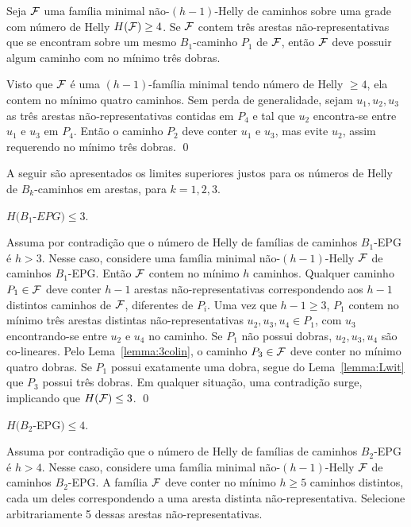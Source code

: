 \begin{lemma} \label{lemma:Lwit}
Seja $\cal{F}$ uma família minimal não-$(h-1)$-Helly de caminhos sobre uma grade com  número de Helly $H({\cal F}) \geq 4$. Se  ${\cal F}$ contem três arestas  não-representativas que se encontram sobre um mesmo $B_1$-caminho  $P_1$ de $\cal{F}$, então $\cal {F}$ deve possuir algum caminho com no mínimo três dobras. \end{lemma}

\proof
Visto que $\cal{F}$ é uma  $(h-1)$-família minimal tendo  número de Helly $\geq 4$, ela contem no mínimo quatro caminhos. Sem perda de generalidade, sejam  $u_1, u_2, u_3$ as três arestas não-representativas contidas em $P_4$ e tal que  $u_2$ encontra-se entre $u_1$ e $u_3$ em $P_4$. Então o caminho $P_2$ deve conter $u_1$ e $u_3$, mas evite $u_2$, assim requerendo no mínimo três dobras.  
\qed

A seguir são apresentados os limites superiores justos para os números de Helly de $B_k$-caminhos em arestas, para $k = 1,2,3$.

\begin{lema}\label{claim:upper-B1}
$H(B_1$-$EPG) \leq 3.$
\end{lema}
 
\proof
Assuma por contradição que o número de Helly de famílias de caminhos $B_1$-EPG é $h > 3$. Nesse caso, considere uma família minimal não-$(h-1)$-Helly $\cal F$ de caminhos $B_1$-EPG. Então $\cal F$ contem no mínimo  $h$ caminhos.  
Qualquer caminho $P_1 \in \cal{F}$ deve conter $h-1$ arestas não-representativas  correspondendo aos $h-1$ distintos caminhos de $\cal F$, diferentes de $P_i$. Uma vez que $h-1 \geq 3$, $P_1$  contem no mínimo três arestas  distintas não-representativas $u_2, u_3, u_4 \in P_1$, com $u_3$ encontrando-se entre $u_2$ e $u_4$ no caminho.  Se $P_1$ não possui dobras, $u_2,u_3,u_4$ são co-lineares. Pelo Lema~\ref{lemma:3colin},  o caminho $P_3 \in \cal{F}$ deve conter no mínimo quatro dobras. Se $P_1$ possui exatamente uma dobra, segue do Lema~\ref{lemma:Lwit} que $P_3$ possui três dobras. Em qualquer situação, uma contradição surge, implicando que $H({\cal F}) \leq 3$.
\qed

\begin{lema}\label{claim:upper-B2}
$H(B_2$-EPG$) \leq 4.$
\end{lema}

\proof
Assuma por contradição que o  número de Helly de famílias de caminhos  $B_2$-EPG é $h > 4$. Nesse caso, considere uma família minimal não-$(h-1)$-Helly  $\cal F$ de caminhos $B_2$-EPG. A família  $\cal F$ deve conter no mínimo $h \geq 5$ caminhos distintos, cada um deles correspondendo a uma aresta distinta  não-representativa. Selecione arbitrariamente 5 dessas arestas não-representativas.


